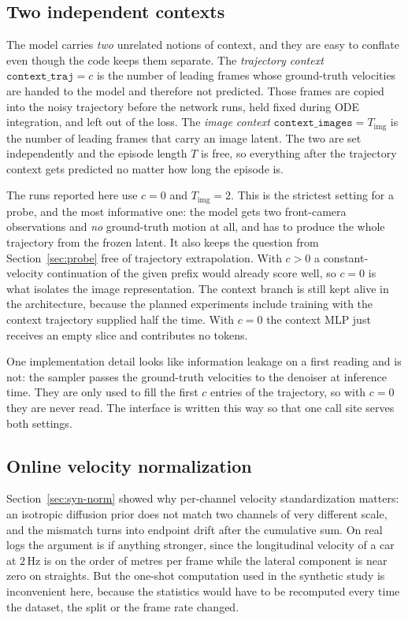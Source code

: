 \subsection{Two independent contexts}
\label{sec:navsim-contexts}

The model carries \emph{two} unrelated notions of context, and they are easy to
conflate even though the code keeps them separate. The \emph{trajectory context}
$\texttt{context\_traj}=c$ is the number of leading frames whose ground-truth
velocities are handed to the model and therefore not predicted. Those frames are
copied into the noisy trajectory before the network runs, held fixed during ODE
integration, and left out of the loss. The \emph{image context}
$\texttt{context\_images}=T_{\text{img}}$ is the number of leading frames that
carry an image latent. The two are set independently and the episode length $T$
is free, so everything after the trajectory context gets predicted no matter how
long the episode is.

The runs reported here use $c=0$ and $T_{\text{img}}=2$. This is the strictest
setting for a probe, and the most informative one: the model gets two
front-camera observations and \emph{no} ground-truth motion at all, and has to
produce the whole trajectory from the frozen latent. It also keeps the question
from Section~\ref{sec:probe} free of trajectory extrapolation. With $c>0$ a
constant-velocity continuation of the given prefix would already score well, so
$c=0$ is what isolates the image representation. The context branch is still kept
alive in the architecture, because the planned experiments include training with
the context trajectory supplied half the time. With $c=0$ the context MLP just
receives an empty slice and contributes no tokens.

One implementation detail looks like information leakage on a first reading and
is not: the sampler passes the ground-truth velocities to the denoiser at
inference time. They are only used to fill the first $c$ entries of the
trajectory, so with $c=0$ they are never read. The interface is written this way
so that one call site serves both settings.

\subsection{Online velocity normalization}
\label{sec:navsim-norm}

Section~\ref{sec:syn-norm} showed why per-channel velocity standardization
matters: an isotropic diffusion prior does not match two channels of very
different scale, and the mismatch turns into endpoint drift after the cumulative
sum. On real logs the argument is if anything stronger, since the longitudinal
velocity of a car at $2$\,Hz is on the order of metres per frame while the
lateral component is near zero on straights. But the one-shot computation used in
the synthetic study is inconvenient here, because the statistics would have to be
recomputed every time the dataset, the split or the frame rate changed.

